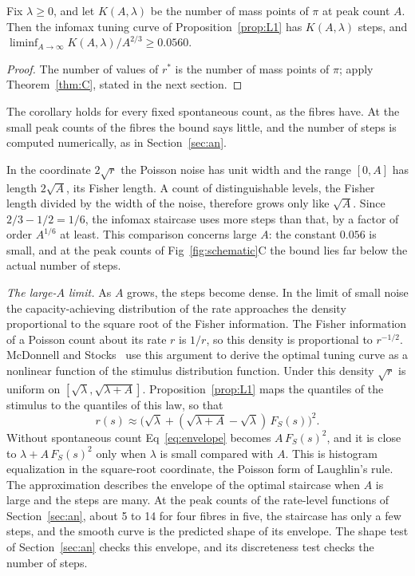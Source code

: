 \begin{corollary}\label{cor:L2}
Fix $\lambda\ge0$, and let $K(A,\lambda)$ be the number of mass points of $\pi$ at peak count $A$. Then the infomax tuning curve of
Proposition~\ref{prop:L1} has $K(A,\lambda)$ steps, and $\liminf_{A\to\infty}K(A,\lambda)/A^{2/3}\ge 0.0560$.
\end{corollary}
\begin{proof}
The number of values of $r^*$ is the number of mass points of $\pi$; apply Theorem~\ref{thm:C}, stated in the next section.
\end{proof}

The corollary holds for every fixed spontaneous count, as the fibres have. At the small peak counts of the fibres the bound says
little, and the number of steps is computed numerically, as in Section~\ref{sec:an}.

In the coordinate $2\sqrt r$ the Poisson noise has unit width and the range $[0,A]$ has length $2\sqrt A$, its Fisher length. A count
of distinguishable levels, the Fisher length divided by the width of the noise, therefore grows only like $\sqrt A$. Since
$2/3-1/2=1/6$, the infomax staircase uses more steps than that, by a factor of order $A^{1/6}$ at least. This comparison concerns
large $A$: the constant $0.056$ is small, and at the peak counts of Fig~\ref{fig:schematic}C the bound lies far below the actual
number of steps.

\emph{The large-$A$ limit.} As $A$ grows, the steps become dense. In the limit of small noise the capacity-achieving distribution of
the rate approaches the density proportional to the square root of the Fisher information. The Fisher information of a Poisson
count about its rate $r$ is $1/r$, so this density is proportional to $r^{-1/2}$. McDonnell and Stocks~\cite{McDonnellStocks2008} use this argument to derive the optimal tuning curve as a
nonlinear function of the stimulus distribution function. Under this density $\sqrt r$ is uniform on $[\sqrt\lambda,\sqrt{\lambda+A}]$.
Proposition~\ref{prop:L1} maps the quantiles of the stimulus to the quantiles of this law, so that
\begin{equation}
r(s)\approx\bigl(\sqrt\lambda+(\sqrt{\lambda+A}-\sqrt\lambda)\,F_S(s)\bigr)^2 .\label{eq:envelope}
\end{equation}
Without spontaneous count Eq~\eqref{eq:envelope} becomes $A\,F_S(s)^2$, and it is close to $\lambda+A\,F_S(s)^2$ only when $\lambda$ is small compared with
$A$. This is histogram equalization in the square-root coordinate, the Poisson form of Laughlin's rule. The approximation describes the
envelope of the optimal staircase when $A$ is large and the steps are many. At the peak counts of the rate-level functions of Section~\ref{sec:an},
about 5 to 14 for four fibres in five, the staircase has only a few steps, and the smooth curve is the predicted shape of its envelope. The shape test of Section~\ref{sec:an} checks this envelope, and its
discreteness test checks the number of steps.
